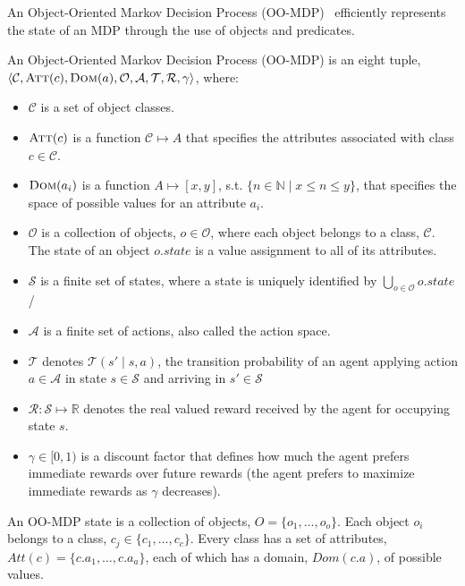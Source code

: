 \documentclass[11pt]{article}
\begin{document}
An Object-Oriented Markov Decision Process (OO-MDP)~\cite{diuk08} efficiently represents the state
of an MDP through the use of objects and predicates. \\

{ An \textup{Object-Oriented Markov Decision Process (OO-MDP)} is an eight tuple, $\langle \mathcal{C}, \textsc{Att}(c), \textsc{Dom}(a), \mathcal{O},
\mathcal{A}, \mathcal{T}, \mathcal{R}, \gamma \rangle$, where:

\begin{itemize}
\item $\mathcal{C}$ is a set of object classes.
\item $\textsc{Att}(c)$ is a function $\mathcal{C} \mapsto A$ that specifies the attributes associated with class $c \in \mathcal{C}$.
\item $\textsc{Dom}(a_i)$ is a function $A \mapsto [x,y]$, s.t. $\{n \in \mathbb{N} \mid x \leq n \leq y \}$, that specifies the space of possible values for an attribute $a_i$.
\item $\mathcal{O}$ is a collection of objects, $o \in \mathcal{O}$, where each object belongs to a class, $\mathcal{C}$. The \textup{state} of an object $o.state$ is a value assignment to all of its attributes.
\item $\mathcal{S}$ is a finite set of states, where a state is uniquely identified by $\bigcup_{o \in \mathcal{O}} o.state$/
\item $\mathcal{A}$ is a finite set of actions, also called the \textup{action space}.
\item $\mathcal{T}$ denotes $\mathcal{T}(s' \mid s,a)$, the
transition probability of an agent applying action $a \in \mathcal{A}$
in state $s \in \mathcal{S}$ and arriving in $s' \in \mathcal{S}$
\item $\mathcal{R} : \mathcal{S} \mapsto \mathbb{R}$ denotes the real valued reward received by the agent for
occupying state $s$.
\item $\gamma \in [0, 1)$ is a discount factor that defines how much the
  agent prefers immediate rewards over future rewards (the agent
  prefers to maximize immediate rewards as $\gamma$ decreases).
\end{itemize}}

An OO-MDP state is a collection of objects, $O = \{o_1, \ldots, o_o \}$.  Each object
$o_i$ belongs to a class, $c_j \in \{c_1, \ldots, c_c\}$. Every class
has a set of attributes, $Att(c) = \{c.a_1, \ldots, c.a_a \}$, each of
which has a domain, $Dom(c.a)$, of possible values. 
\end{document}
